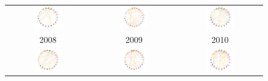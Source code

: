 \begin{figure}[H]
	\begin{tabular}{ccc}
		\includegraphics[width=0.35\textwidth]{Imagens/rede-exact-br-2008.pdf} &   \includegraphics[width=0.35\textwidth]{Imagens/rede-exact-br-2009.pdf} &
		\includegraphics[width=0.35\textwidth]{Imagens/rede-exact-br-2010.pdf}\\
		2008 & 2009 & 2010\\[6pt] 
		\includegraphics[width=0.35\textwidth]{Imagens/rede-exact-br-2011.pdf} &
		\includegraphics[width=0.35\textwidth]{Imagens/rede-exact-br-2012.pdf} &   \includegraphics[width=0.35\textwidth]{Imagens/rede-exact-br-2013.pdf} \\

\end{tabular}
\end{figure}
